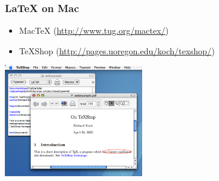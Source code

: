 \documentclass[utf8x]{beamer}
\begin{document}
    \begin{frame}
      \frametitle{\LaTeX{} on Mac}
      \begin{itemize}
        \item Mac\TeX{} (\url{http://www.tug.org/mactex/})
        \item \TeX Shop (\url{http://pages.uoregon.edu/koch/texshop/})
      \end{itemize}
      \begin{center}
        \includegraphics[width=0.45\textwidth]{TeXshop}%
      \end{center}
    \end{frame}
\end{document}
